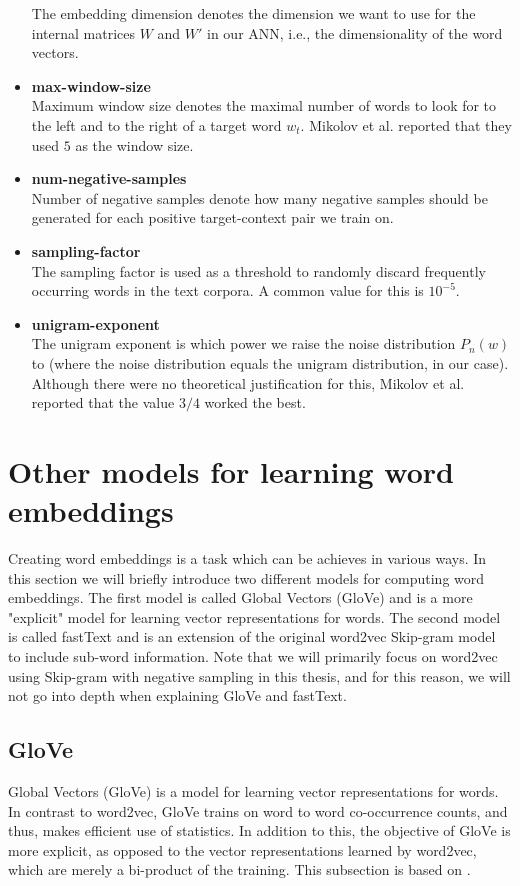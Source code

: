 \begin{itemize}
        The embedding dimension denotes the dimension we want to use for the internal matrices $W$ and $W'$ in our ANN, i.e., the dimensionality of the word vectors.
    \item \textbf{max-window-size} \\
        Maximum window size denotes the maximal number of words to look for to the left and to the right of a target word $w_t$. Mikolov et al. reported that they used $5$ as the window size.
    \item \textbf{num-negative-samples} \\
        Number of negative samples denote how many negative samples should be generated for each positive target-context pair we train on.
    \item \textbf{sampling-factor} \\
        The sampling factor is used as a threshold to randomly discard frequently occurring words in the text corpora. A common value for this is $10^{-5}$.
    \item \textbf{unigram-exponent} \\
        The unigram exponent is which power we raise the noise distribution $P_n(w)$ to (where the noise distribution equals the unigram distribution, in our case). Although there were no theoretical justification for this, Mikolov et al. reported that the value $3/4$ worked the best.
\end{itemize}

\section{Other models for learning word embeddings}
Creating word embeddings is a task which can be achieves in various ways. In this section we will briefly introduce two different models for computing word embeddings. The first model is called Global Vectors (GloVe) \cite{pennington2014glove} and is a more "explicit" model for learning vector representations for words. The second model is called fastText \cite{bojanowski2017enriching} and is an extension of the original word2vec Skip-gram model to include sub-word information. Note that we will primarily focus on word2vec using Skip-gram with negative sampling in this thesis, and for this reason, we will not go into depth when explaining GloVe and fastText.

\subsection{GloVe}
Global Vectors (GloVe) \cite{pennington2014glove} is a model for learning vector representations for words. In contrast to word2vec, GloVe trains on word to word co-occurrence counts, and thus, makes efficient use of statistics. In addition to this, the objective of GloVe is more explicit, as opposed to the vector representations learned by word2vec, which are merely a bi-product of the training. This subsection is based on \cite{pennington2014glove}.


